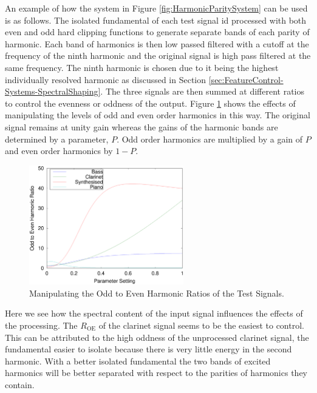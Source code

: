 			An example of how the system in Figure \ref{fig:HarmonicParitySystem} can be used is as follows.
			The isolated fundamental of each test signal id processed with both even and odd hard clipping
			functions to generate separate bands of each parity of harmonic. Each band of harmonics is then low
			passed filtered with a cutoff at the frequency of the ninth harmonic and the original signal is
			high pass filtered at the same frequency. The ninth harmonic is chosen due to it being the highest
			individually resolved harmonic as discussed in Section
			\ref{sec:FeatureControl-Systems-SpectralShaping}. The three signals are then summed at different
			ratios to control the evenness or oddness of the output. Figure \ref{fig:MoveParities} shows the
			effects of manipulating the levels of odd and even order harmonics in this way. The original signal
			remains at unity gain whereas the gains of the harmonic bands are determined by a parameter, $P$.
			Odd order harmonics are multiplied by a gain of $P$ and even order harmonics by $1 - P$.

			\begin{figure}[h!]
				\centering
				\includegraphics[width=0.6\textwidth]{chapter6/Images/MoveParities.eps}
				\caption{Manipulating the Odd to Even Harmonic Ratios of the Test Signals.}
				\label{fig:MoveParities}
			\end{figure}

			Here we see how the spectral content of the input signal influences the effects of the processing.
			The $R_{\textrm{OE}}$ of the clarinet signal seems to be the easiest to control. This can be
			attributed to the high oddness of the unprocessed clarinet signal, the fundamental easier to
			isolate because there is very little energy in the second harmonic. With a better isolated
			fundamental the two bands of excited harmonics will be better separated with respect to the
			parities of harmonics they contain.

